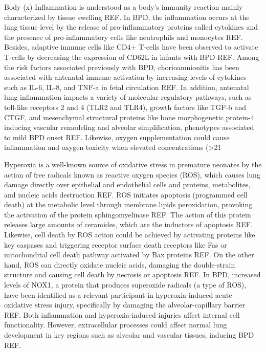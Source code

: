 Body (x)
Inflammation is understood as a body’s immunity reaction mainly characterized by tissue swelling REF. In BPD, the inflammation occurs at the lung tissue level by the release of pro-inflammatory proteins called cytokines and the presence of pro-inflammatory cells like neutrophils and monocytes REF. Besides, adaptive immune cells like CD4+ T-cells have been observed to activate T-cells by decreasing the expression of CD62L in infants with BPD REF. Among the risk factors associated previously with BPD, chorioamnionitis has been associated with antenatal immune activation by increasing levels of cytokines such as IL-6, IL-8, and TNF-a in fetal circulation REF. In addition, antenatal lung inflammation impacts a variety of molecular regulatory pathways, such as toll-like receptors 2 and 4 (TLR2 and TLR4), growth factors like TGF-b and CTGF, and mesenchymal structural proteins like bone morphogenetic protein-4 inducing vascular remodeling and alveolar simplification, phenotypes associated to mild BPD onset REF. Likewise, oxygen supplementation could cause inflammation and oxygen toxicity when elevated concentrations (>21%

Hyperoxia is a well-known source of oxidative stress in premature neonates by the action of free radicals known as reactive oxygen species (ROS), which causes lung damage directly over epithelial and endothelial cells and proteins, metabolites, and nucleic acids destruction REF. ROS initiates apoptosis (programmed cell death) at the metabolic level through membrane lipids peroxidation, provoking the activation of the protein sphingomyelinase REF. The action of this protein releases large amounts of ceramides, which are the inductors of apoptosis REF. Likewise, cell death by ROS action could be achieved by activating proteins like key caspases and triggering receptor surface death receptors like Fas or mitochondrial cell death pathway activated by Bax proteins REF. On the other hand, ROS can directly oxidate nucleic acids, damaging the double-strain structure and causing cell death by necrosis or apoptosis REF. In BPD, increased levels of NOX1, a protein that produces superoxide radicals (a type of ROS), have been identified as a relevant participant in hyperoxia-induced acute oxidative stress injury, specifically by damaging the alveolar-capillary barrier REF. Both inflammation and hyperoxia-induced injuries affect internal cell functionality. However, extracellular processes could affect normal lung development in key regions such as alveolar and vascular tissues, inducing BPD REF.


